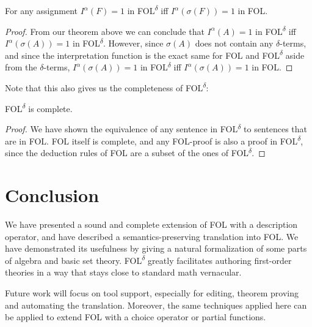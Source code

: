 \documentclass{article}
\begin{document}
\begin{theorem}
For any assignment $I^\alpha (F)=1$ in FOL\textsuperscript{$\delta$} iff $I^\alpha (\sigma(F))=1$ in FOL.
\end{theorem}
\begin{proof}
From our theorem above we can conclude that $I^\alpha (A)=1$ in FOL\textsuperscript{$\delta$} iff $I^\alpha (\sigma(A))=1$ in FOL\textsuperscript{$\delta$}. However, since $\sigma(A)$ does not contain any $\delta$-terms, and since the interpretation function is the exact same for FOL and FOL\textsuperscript{$\delta$} aside from the $\delta$-terms, $I^\alpha (\sigma(A))=1$ in FOL\textsuperscript{$\delta$} iff $I^\alpha (\sigma(A))=1$ in FOL. 
\end{proof} 

Note that this also gives us the completeness of FOL\textsuperscript{$\delta$}:
\begin{theorem}
FOL\textsuperscript{$\delta$} is complete.
\end{theorem} 
\begin{proof}
We have shown the equivalence of any sentence in FOL\textsuperscript{$\delta$} to sentences that are in FOL. FOL itself is complete, and any FOL-proof is also a proof in FOL\textsuperscript{$\delta$}, since the deduction rules of FOL are a subset of the ones of FOL\textsuperscript{$\delta$}.
\end{proof}


\section{Conclusion}


We have presented a sound and complete extension of FOL with a description operator, and have described a semantics-preserving translation into FOL. We have demonstrated its usefulness by giving a natural formalization of some parts of algebra and basic set theory. FOL\textsuperscript{$\delta$} greatly facilitates authoring first-order theories in a way that stays close to standard math vernacular.

Future work will focus on tool support, especially for editing, theorem proving and automating the translation.
Moreover, the same techniques applied here can be applied to extend FOL with a choice operator or partial functions.
\end{document}
